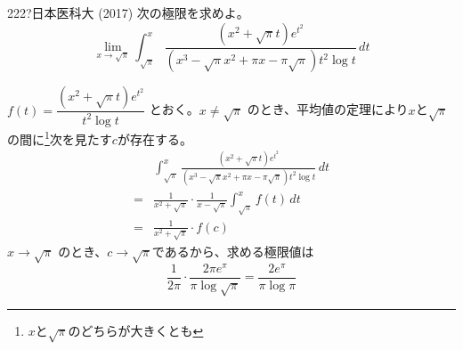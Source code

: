 \begin{prob}{222}{\hosi ?}{日本医科大 (2017)}
 次の極限を求めよ。 \\
 \[ \lim_{x\to\sqrt{\pi}} \int_{\sqrt{\pi}}^x\! \frac{(x^2+\sqrt{\pi}t)e^{t^2}}{(x^3-\sqrt{\pi}x^2+\pi x-\pi\sqrt{\pi})t^2\log t} \,dt \]
\end{prob}
$f(t)=\dfrac{(x^2+\sqrt{\pi} t)e^{t^2}}{t^2\log t}$ とおく。$x\neq\sqrt{\pi}$ のとき、平均値の定理により$x$と$\sqrt{\pi}$の間に\footnote{$x$と$\sqrt{\pi}$のどちらが大きくとも}次を見たす$c$が存在する。
\begin{align*}
 &\int_{\sqrt{\pi}}^x\! \frac{(x^2+\sqrt{\pi}t)e^{t^2}}{(x^3-\sqrt{\pi}x^2+\pi x-\pi\sqrt{\pi})t^2\log t} \,dt \\
 =& \frac{1}{x^2+\sqrt{\pi}}\cdot\frac{1}{x-\sqrt{\pi}}\int_{\sqrt{\pi}}^x\!f(t)\,dt \\
 =& \frac{1}{x^2+\sqrt{\pi}}\cdot f(c)
\end{align*}
$x\to\sqrt{\pi}$ のとき、$c\to\sqrt{\pi}$であるから、求める極限値は
\[ \frac{1}{2\pi}\cdot\frac{2\pi e^\pi}{\pi\log\sqrt{\pi}} = \frac{2e^\pi}{\pi\log\pi} \]